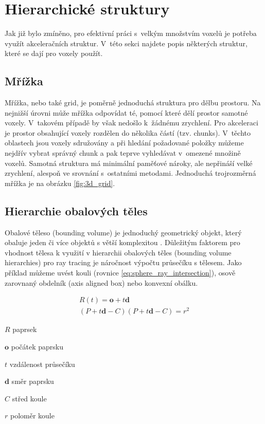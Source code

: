 \section{Hierarchické struktury}
Jak již bylo zmíněno, pro efektivní práci s~velkým množstvím voxelů je potřeba využít akceleračních struktur. V~této sekci najdete popis některých struktur, které se dají pro voxely použít.

\subsection{Mřížka}
Mřížka, nebo také grid, je poměrně jednoduchá struktura pro dělbu prostoru. Na nejnižší úrovni může mřížka odpovídat té, pomocí které dělí prostor samotné voxely. V~takovém případě by však nedošlo k~žádnému zrychlení. Pro akceleraci je prostor obsahující voxely rozdělen do několika částí (tzv. chunks). V~těchto oblastech jsou voxely sdružovány a při hledání požadované položky můžeme nejdřív vybrat správný chunk a pak teprve vyhledávat v~omezené množině voxelů. Samotná struktura má minimální paměťové nároky, ale nepřináší velké zrychlení, alespoň ve srovnání s~ostatními metodami. Jednoduchá trojrozměrná mřížka je na obrázku \ref{fig:3d_grid}.

\subsection{Hierarchie obalových těles} \label{sec:BVH}
Obalové těleso (bounding volume) je jednoduchý geometrický objekt, který obaluje jeden či více objektů s větší komplexitou \cite{ericson_2005}. Důležitým faktorem pro vhodnost tělesa k využití v hierarchii obalových těles (bounding volume hierarchies) pro ray tracing je náročnost výpočtu průsečíku s tělesem. Jako příklad můžeme uvést kouli (rovnice \ref{eq:sphere_ray_intersection}), osově zarovnaný obdelník (axis aligned box) nebo konvexní obálku. 

\begin{equation} \label{eq:sphere_ray_intersection}
	\begin{gathered}
	    R(t) = \textbf{o} + t\textbf{d}  \\
	    
	    (P + t\textbf{d} - C) (P + t\textbf{d} - C) = r^2
	    
	\end{gathered}
\end{equation}

\begin{eqexpl}[60mm]
\item{$R$} paprsek
\item{$\textbf{o}$} počátek paprsku
\item{$t$} vzdálenost průsečíku
\item{$\textbf{d}$} směr paprsku
\item{$C$} střed koule
\item{$r$} poloměr koule
\end{eqexpl}

